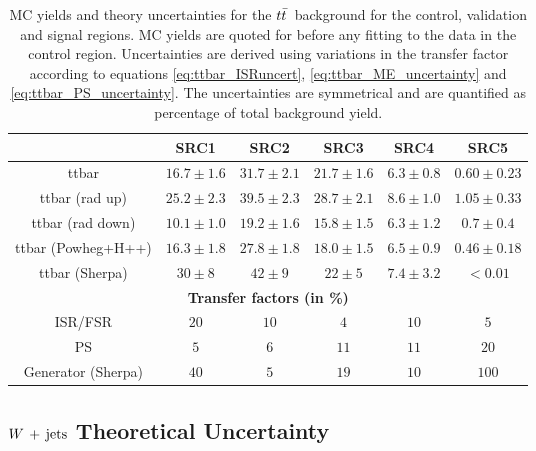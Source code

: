 \begin{table}[!h]
\begin{center}
      \begin{tabular}{|c|c|c|c|c|c|}
	\noalign{\smallskip}\noalign{\smallskip}\hline
         & SRC1 & SRC2 & SRC3 & SRC4 & SRC5 \\
        \hline
ttbar&    $16.7\pm 1.6 $&         $31.7\pm 2.1 $&         $21.7\pm 1.6 $&         $6.3\pm 0.8 $&          $0.60\pm 0.23 $\\
ttbar (rad up)&            $25.2\pm 2.3 $&         $39.5\pm 2.3 $&         $28.7\pm 2.1 $&         $8.6\pm 1.0 $&  $1.05\pm 0.33 $\\
ttbar (rad down)&         $10.1\pm 1.0 $&         $19.2\pm 1.6 $&         $15.8\pm 1.5 $&         $6.3\pm 1.2 $&  $0.7\pm 0.4 $\\
ttbar (Powheg+H++)&      $16.3\pm 1.8 $&         $27.8\pm 1.8 $&         $18.0\pm 1.5 $&         $6.5\pm 0.9 $&  $0.46\pm 0.18 $\\
ttbar (Sherpa)&            $30\pm 8 $&     $42\pm 9 $&     $22\pm 5 $&     $7.4\pm 3.2 $&          $<0.01$\\        
        \hline
        \multicolumn{6}{c}{\bf Transfer factors (in \%)} \\ \hline
        ISR/FSR  &      $20$&   $10$&   $4$&    $10$&   $5$\\
        PS &   $5$&    $6$&    $11$&   $11$&   $20$\\
        Generator (Sherpa)  &    $40$&   $5$&    $19$&   $10$&   $100$\\
        \hline       
        \end{tabular}
       
        
    \end{center}
    \caption{MC yields and theory uncertainties for the $t\bar{t}$\ background for the control, validation and signal regions.  MC yields are quoted for before any fitting to the data in the control region. Uncertainties are derived using variations in the transfer factor according to equations \ref{eq:ttbar_ISRuncert}, \ref{eq:ttbar_ME_uncertainty} and \ref{eq:ttbar_PS_uncertainty}. The uncertainties are symmetrical and are quantified as percentage of total background yield. }
    \label{tab:ttbar_unc_SRC}
  \end{table}

\subsection{$W\,+\,\mathrm{jets}$ Theoretical Uncertainty}

